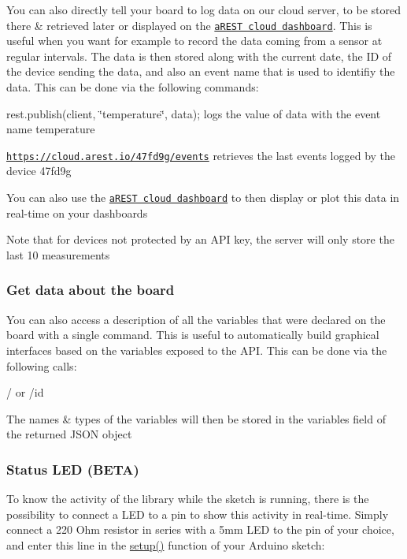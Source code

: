 You can also directly tell your board to log data on our cloud server, to be stored there \& retrieved later or displayed on the \href{https://dashboard.arest.io/}{\tt a\+R\+E\+ST cloud dashboard}. This is useful when you want for example to record the data coming from a sensor at regular intervals. The data is then stored along with the current date, the ID of the device sending the data, and also an event name that is used to identifiy the data. This can be done via the following commands\+:
\begin{DoxyItemize}
\item {\ttfamily rest.\+publish(client, \char`\"{}temperature\char`\"{}, data);} logs the value of {\ttfamily data} with the event name {\ttfamily temperature}
\item {\ttfamily \href{https://cloud.arest.io/47fd9g/events}{\tt https\+://cloud.\+arest.\+io/47fd9g/events}} retrieves the last events logged by the device {\ttfamily 47fd9g}
\item You can also use the \href{https://dashboard.arest.io/}{\tt a\+R\+E\+ST cloud dashboard} to then display or plot this data in real-\/time on your dashboards
\item Note that for devices not protected by an A\+PI key, the server will only store the last 10 measurements
\end{DoxyItemize}

\subsubsection*{Get data about the board}

You can also access a description of all the variables that were declared on the board with a single command. This is useful to automatically build graphical interfaces based on the variables exposed to the A\+PI. This can be done via the following calls\+:
\begin{DoxyItemize}
\item {\ttfamily /} or {\ttfamily /id}
\item The names \& types of the variables will then be stored in the variables field of the returned J\+S\+ON object
\end{DoxyItemize}

\subsubsection*{Status L\+ED (B\+E\+TA)}

To know the activity of the library while the sketch is running, there is the possibility to connect a L\+ED to a pin to show this activity in real-\/time. Simply connect a 220 Ohm resistor in series with a 5mm L\+ED to the pin of your choice, and enter this line in the \hyperlink{nodemcu_8cpp_a7dfd9b79bc5a37d7df40207afbc5431f}{setup()} function of your Arduino sketch\+:


